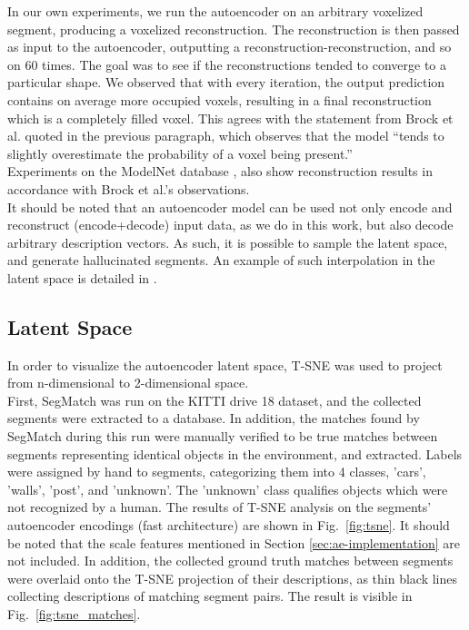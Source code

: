 In our own experiments, we run the autoencoder on an arbitrary voxelized segment, producing a voxelized reconstruction. The reconstruction is then passed as input to the autoencoder, outputting a reconstruction-reconstruction, and so on 60 times. The goal was to see if the reconstructions tended to converge to a particular shape. We observed that with every iteration, the output prediction contains on average more occupied voxels, resulting in a final reconstruction which is a completely filled voxel. This agrees with the statement from Brock et al. \cite{voxel-autoencoder} quoted in the previous paragraph, which observes that the model ``tends to slightly overestimate the probability of a voxel being present.''\\

Experiments on the ModelNet database \cite{modelnet}, also show reconstruction results in accordance with Brock et al.'s observations.\\

It should be noted that an autoencoder model can be used not only encode and reconstruct (encode+decode) input data, as we do in this work, but also decode arbitrary description vectors. As such, it is possible to sample the latent space, and generate hallucinated segments. An example of such interpolation in the latent space is detailed in \citet{voxel-autoencoder}.

\subsection{Latent Space}
\label{subsec:latent_space}

In order to visualize the autoencoder latent space, T-SNE was used to project from n-dimensional to 2-dimensional space. \\

First, SegMatch was run on the KITTI drive 18 dataset, and the collected segments were extracted to a database. In addition, the matches found by SegMatch during this run were manually verified to be true matches between segments representing identical objects in the environment, and extracted. Labels were assigned by hand to segments, categorizing them into 4 classes, 'cars', 'walls', 'post', and 'unknown'. The 'unknown' class qualifies objects which were not recognized by a human. The results of T-SNE analysis on the segments' autoencoder encodings (fast architecture) are shown in Fig.~\ref{fig:tsne}. It should be noted that the scale features mentioned in Section \ref{sec:ae-implementation} are not included. In addition, the collected ground truth matches between segments were overlaid onto the T-SNE projection of their descriptions, as thin black lines collecting descriptions of matching segment pairs. The result is visible in Fig.~\ref{fig:tsne_matches}.\\

